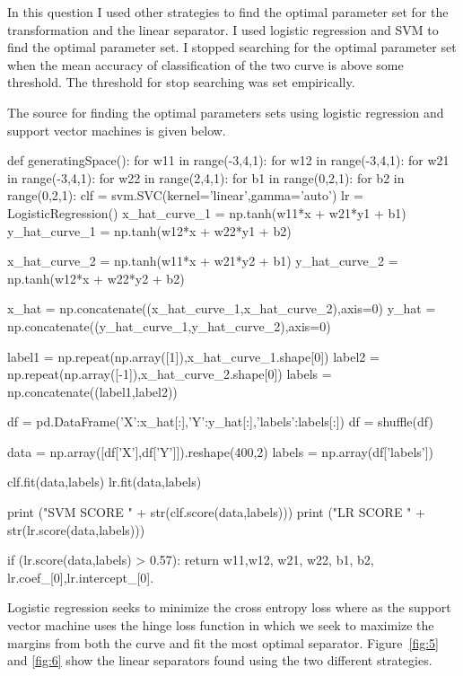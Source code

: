 \documentclass[12pt]{report}
\begin{document}
In this question I used other strategies to find the optimal parameter set for the transformation and the linear separator. I used logistic regression and SVM to find the optimal parameter set. I stopped searching for the optimal parameter set when the mean accuracy of classification of the two curve is above some threshold. The threshold for stop searching was set empirically. 

The source for finding the optimal parameters sets using logistic regression and support vector machines is given below. 

\begin{python}
	def generatingSpace():
		for w11 in range(-3,4,1):
			for w12 in range(-3,4,1):
				for w21 in range(-3,4,1):
					for w22 in range(2,4,1):
						for b1 in range(0,2,1):
							for b2 in range(0,2,1):
								clf = svm.SVC(kernel='linear',gamma='auto')
								lr = LogisticRegression()
								x_hat_curve_1 = np.tanh(w11*x + w21*y1 + b1)
								y_hat_curve_1 = np.tanh(w12*x + w22*y1 + b2)
								
								x_hat_curve_2 = np.tanh(w11*x + w21*y2 + b1)
								y_hat_curve_2 = np.tanh(w12*x + w22*y2 + b2)
								
								
								x_hat = np.concatenate((x_hat_curve_1,x_hat_curve_2),axis=0)
								y_hat = np.concatenate((y_hat_curve_1,y_hat_curve_2),axis=0)	
								
								
								label1 = np.repeat(np.array([1]),x_hat_curve_1.shape[0])
								label2 = np.repeat(np.array([-1]),x_hat_curve_2.shape[0])
								labels = np.concatenate((label1,label2))
								
								df = pd.DataFrame({'X':x_hat[:],'Y':y_hat[:],'labels':labels[:]})
								df = shuffle(df)
								
								
								data = np.array([df['X'],df['Y']]).reshape(400,2)
								labels = np.array(df['labels'])
								
								clf.fit(data,labels) 
								lr.fit(data,labels)
								
								print ("SVM SCORE " + str(clf.score(data,labels)))
								print ("LR SCORE " + str(lr.score(data,labels)))
								
								if (lr.score(data,labels) > 0.57):
									return w11,w12, w21, w22, b1, b2, lr.coef_[0],lr.intercept_[0].
\end{python} 

Logistic regression seeks to minimize the cross entropy loss where as the support vector machine uses the hinge loss function in which we seek to maximize the margins from both the curve and fit the most optimal separator. Figure~\ref{fig:5} and \ref{fig:6} show the linear separators found using the two different strategies.
\end{document}
